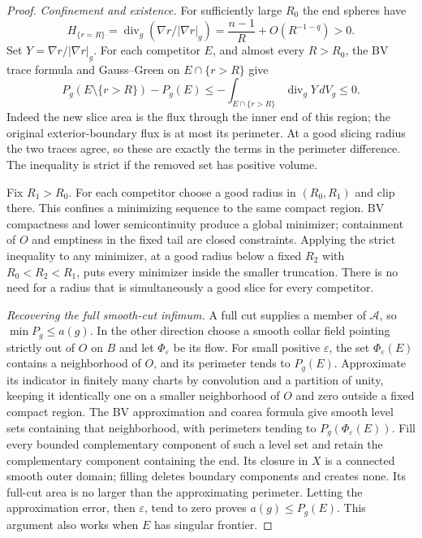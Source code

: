 \begin{proof}
\emph{Confinement and existence.}
For sufficiently large $R_0$ the end spheres have
\[
 H_{\{r=R\}}=\operatorname{div}_g
       (\nabla r/|\nabla r|_g)
       =\frac{n-1}{R}+O(R^{-1-q})>0.
\]
Set $Y=\nabla r/|\nabla r|_g$. For each competitor $E$, and almost
every $R>R_0$, the BV trace formula and Gauss--Green on
$E\cap\{r>R\}$ give
\begin{equation}\label{q:geometry:clipping}
 P_g(E\setminus\{r>R\})-P_g(E)
 \le-\int_{E\cap\{r>R\}}\operatorname{div}_gY\,dV_g\le0.
\end{equation}
Indeed the new slice area is the flux through the inner end of this
region; the original exterior-boundary flux is at most its perimeter.
At a good slicing radius the two traces agree, so these are exactly
the terms in the perimeter difference. The inequality is strict if
the removed set has positive volume.

Fix $R_1>R_0$. For each competitor choose a good radius in
$(R_0,R_1)$ and clip there. This confines a minimizing sequence to
the same compact region. BV compactness and lower semicontinuity
produce a global minimizer; containment of $O$ and emptiness in the
fixed tail are closed constraints. Applying the strict inequality to
any minimizer, at a good radius below a fixed $R_2$ with
$R_0<R_2<R_1$, puts every minimizer inside the smaller truncation.
There is no need for a radius that is simultaneously a good slice
for every competitor.

\emph{Recovering the full smooth-cut infimum.}
A full cut supplies a member of $\mathcal A$, so
$\min P_g\le a(g)$. In the other direction choose a smooth collar
field pointing strictly out of $O$ on $B$ and let $\Phi_\varepsilon$
be its flow. For small positive $\varepsilon$, the set
$\Phi_\varepsilon(E)$ contains a neighborhood of $O$, and its
perimeter tends to $P_g(E)$. Approximate its indicator in finitely
many charts by convolution and a partition of unity, keeping it
identically one on a smaller neighborhood of $O$ and zero outside a
fixed compact region. The BV approximation and coarea formula give
smooth level sets containing that neighborhood, with perimeters
tending to $P_g(\Phi_\varepsilon(E))$.
Fill every bounded complementary component of such a level set and
retain the complementary component containing the end. Its closure
in $X$ is a connected smooth outer domain; filling deletes boundary
components and creates none. Its full-cut area is no larger than the
approximating perimeter. Letting the approximation error, then
$\varepsilon$, tend to zero proves $a(g)\le P_g(E)$. This argument
also works when $E$ has singular frontier.


\end{proof}
